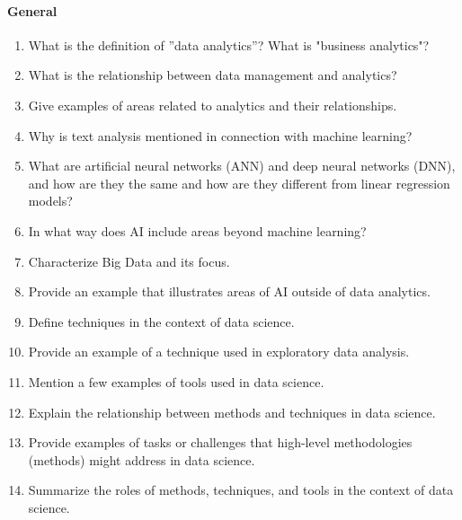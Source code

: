\paragraph*{General}
\begin{enumerate}[nosep]
	\item What is the definition of ''data analytics''? What is "business analytics"?
	\item What is the relationship between data management and analytics?
	\item Give examples of areas related to analytics and their relationships.
	\item Why is text analysis mentioned in connection with machine learning?
	\item What are artificial neural networks (ANN) and deep neural networks (DNN), and how are they the same and how are they different from linear regression models?
	\item In what way does AI include areas beyond machine learning?
	\item Characterize Big Data and its focus.
	\item Provide an example that illustrates areas of AI outside of data analytics.
	\item Define techniques in the context of data science.
    \item Provide an example of a technique used in exploratory data analysis.
	\item Mention a few examples of tools used in data science.
	\item Explain the relationship between methods and techniques in data science.
	\item Provide examples of tasks or challenges that high-level methodologies (methods) might address in data science.
	\item Summarize the roles of methods, techniques, and tools in the context of data science.
\end{enumerate}
